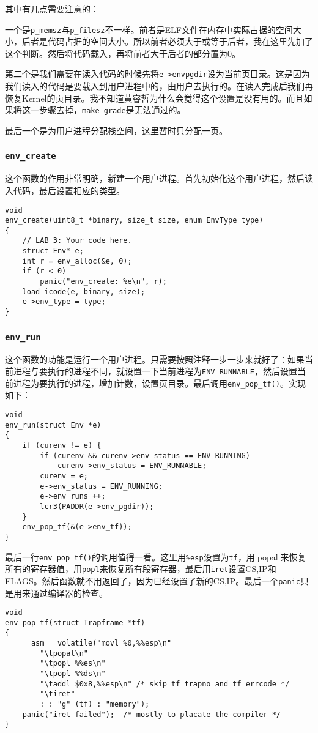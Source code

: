 \documentclass[11pt]{article}
\begin{document}
其中有几点需要注意的：

一个是\lstinline|p_memsz|与\lstinline|p_filesz|不一样。前者是ELF文件在内存中实际占据的空间大小，后者是代码占据的空间大小。所以前者必须大于或等于后者，我在这里先加了这个判断。然后将代码载入，再将前者大于后者的部分置为0。

第二个是我们需要在读入代码的时候先将\lstinline|e->envpgdir|设为当前页目录。这是因为我们读入的代码是要载入到用户进程中的，由用户去执行的。在读入完成后我们再恢复Kernel的页目录。我不知道黄睿哲为什么会觉得这个设置是没有用的。而且如果将这一步骤去掉，\lstinline|make grade|是无法通过的。

最后一个是为用户进程分配栈空间，这里暂时只分配一页。

\subsubsection{\lstinline|env_create|}

这个函数的作用非常明确，新建一个用户进程。首先初始化这个用户进程，然后读入代码，最后设置相应的类型。
\begin{lstlisting}[title=kern/env.c]
void
env_create(uint8_t *binary, size_t size, enum EnvType type)
{
	// LAB 3: Your code here.
	struct Env* e;
	int r = env_alloc(&e, 0);
	if (r < 0)
		panic("env_create: %e\n", r);
	load_icode(e, binary, size);
	e->env_type = type;
}
\end{lstlisting}

\subsubsection{\lstinline|env_run|}
这个函数的功能是运行一个用户进程。只需要按照注释一步一步来就好了：如果当前进程与要执行的进程不同，就设置一下当前进程为\lstinline|ENV_RUNNABLE|，然后设置当前进程为要执行的进程，增加计数，设置页目录。最后调用\lstinline|env_pop_tf()|。实现如下：
\begin{lstlisting}[title=kern/env.c]
void
env_run(struct Env *e)
{
	if (curenv != e) {
		if (curenv && curenv->env_status == ENV_RUNNING)
			curenv->env_status = ENV_RUNNABLE;
		curenv = e;
		e->env_status = ENV_RUNNING;
		e->env_runs ++;
		lcr3(PADDR(e->env_pgdir));
	}
	env_pop_tf(&(e->env_tf));
}
\end{lstlisting}

最后一行\lstinline|env_pop_tf()|的调用值得一看。这里用\lstinline|%esp|设置为\lstinline|tf|，用\lstinlnine|popal|来恢复所有的寄存器值，用\lstinline|popl|来恢复所有段寄存器，最后用\lstinline|iret|设置CS,IP和FLAGS。然后函数就不用返回了，因为已经设置了新的CS,IP。最后一个\lstinline|panic|只是用来通过编译器的检查。
\begin{lstlisting}[title=kern/env.c]
void
env_pop_tf(struct Trapframe *tf)
{
	__asm __volatile("movl %0,%%esp\n"
		"\tpopal\n"
		"\tpopl %%es\n"
		"\tpopl %%ds\n"
		"\taddl $0x8,%%esp\n" /* skip tf_trapno and tf_errcode */
		"\tiret"
		: : "g" (tf) : "memory");
	panic("iret failed");  /* mostly to placate the compiler */
}
\end{lstlisting}
\end{document}
